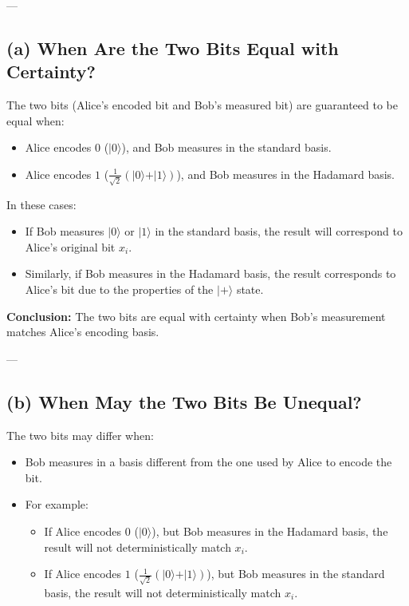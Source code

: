 \documentclass[12pt,letterpaper]{article}
\begin{document}
---

\subsection*{(a) When Are the Two Bits Equal with Certainty?}

The two bits (Alice's encoded bit and Bob's measured bit) are guaranteed to be equal when:
\begin{itemize}
    \item Alice encodes \( 0 \) (\(\vert 0 \rangle\)), and Bob measures in the standard basis.
    \item Alice encodes \( 1 \) (\(\frac{1}{\sqrt{2}}(\vert 0 \rangle + \vert 1 \rangle)\)), and Bob measures in the Hadamard basis.
\end{itemize}
In these cases:
\begin{itemize}
    \item If Bob measures \( \vert 0 \rangle \) or \( \vert 1 \rangle \) in the standard basis, the result will correspond to Alice's original bit \( x_i \).
    \item Similarly, if Bob measures in the Hadamard basis, the result corresponds to Alice's bit due to the properties of the \(\vert + \rangle\) state.
\end{itemize}

\textbf{Conclusion:} The two bits are equal with certainty when Bob's measurement matches Alice's encoding basis.

---

\subsection*{(b) When May the Two Bits Be Unequal?}

The two bits may differ when:
\begin{itemize}
    \item Bob measures in a basis different from the one used by Alice to encode the bit.
    \item For example:
        \begin{itemize}
            \item If Alice encodes \( 0 \) (\(\vert 0 \rangle\)), but Bob measures in the Hadamard basis, the result will not deterministically match \( x_i \).
            \item If Alice encodes \( 1 \) (\(\frac{1}{\sqrt{2}}(\vert 0 \rangle + \vert 1 \rangle)\)), but Bob measures in the standard basis, the result will not deterministically match \( x_i \).
        \end{itemize}
\end{itemize}
\end{document}
